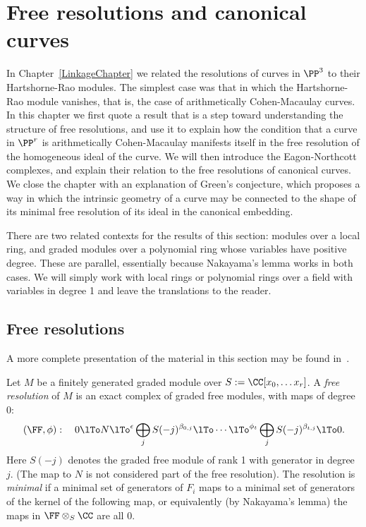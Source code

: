 

\chapter{Free resolutions and canonical curves}
\label{SyzygiesChapter}

\def\length{{\rm length}}

In Chapter~\ref{LinkageChapter} we related the resolutions of curves in $\PP^3$ to their Hartshorne-Rao modules. The
simplest case was that in which the Hartshorne-Rao module vanishes, that is, the case of arithmetically Cohen-Macaulay curves.
In this chapter we first quote a result that is a step toward understanding the structure of free resolutions, and use it to explain how the condition that a curve in $\PP^r$ is arithmetically Cohen-Macaulay manifests itself in the 
free resolution of the homogeneous ideal of the curve.  We will then introduce the Eagon-Northcott complexes, and explain their relation to the free resolutions of canonical curves. We close the chapter with an explanation of Green's conjecture, which proposes a way in which the intrinsic geometry
of a curve may be connected to the shape of its minimal free resolution of its ideal in the canonical embedding.

\begin{remark}
 There are two related contexts for the results of this section:  modules over a local ring, and graded modules over a polynomial ring whose variables have positive degree. These are parallel, essentially because Nakayama's lemma works in both cases. We will simply work with local rings or polynomial rings over a field with variables in degree 1 and leave the translations to the reader.\end{remark}

\section{Free resolutions}
A more complete presentation of the material in this section may be found in~\cite[Chapter 19]{Eisenbud1995}.


Let $M$ be a finitely generated graded module over $S := \CC[x_0, \dots x_r]$. A \emph{free resolution} of $M$ is an exact complex
of graded free modules, with maps of degree 0:
$$
(\FF, \phi):\quad 0\lTo N \lTo^\epsilon \bigoplus_jS(-j)^{\beta_{0,j}} \lTo\cdots
 \lTo^{\phi_t}\bigoplus_jS(-j)^{\beta_{t,j}}\lTo 0.
$$
Here $S(-j)$ denotes the graded free module of rank 1 with generator in degree $j$.
(The map to $N$ is not considered part of the free resolution). The resolution is \emph{minimal} if a minimal set of generators of $F_i$ maps to a minimal set of generators of the kernel of the following map,
or equivalently (by Nakayama's lemma) the maps in $\FF\otimes_S \CC$ are all 0.

